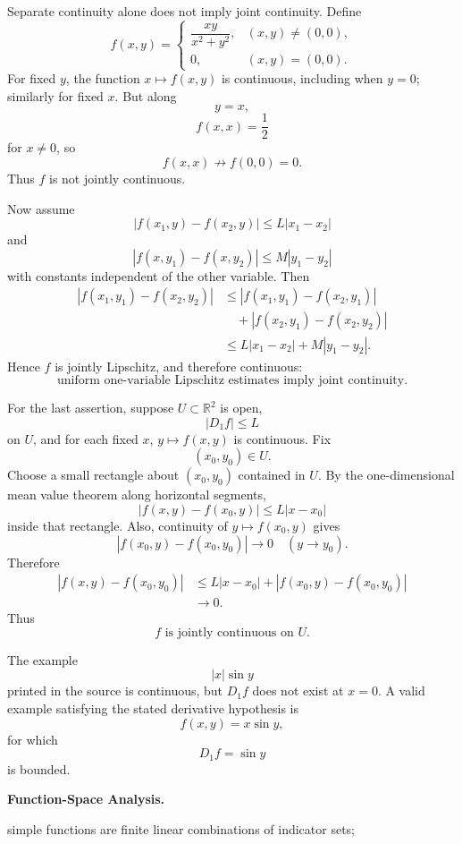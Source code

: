 \begin{solution}
Separate continuity alone does not imply joint continuity. Define
\[
f(x,y)
=
\begin{cases}
\dfrac{xy}{x^2+y^2},
&(x,y)\neq(0,0),\\[2mm]
0,&(x,y)=(0,0).
\end{cases}
\]
For fixed \(y\), the function \(x\mapsto f(x,y)\) is continuous, including when \(y=0\);
similarly for fixed \(x\). But along
\[
y=x,
\]
\[
f(x,x)=\frac12
\]
for \(x\neq0\), so
\[
f(x,x)\not\to f(0,0)=0.
\]
Thus \(f\) is not jointly continuous.

Now assume
\[
|f(x_1,y)-f(x_2,y)|
\le
L|x_1-x_2|
\]
and
\[
|f(x,y_1)-f(x,y_2)|
\le
M|y_1-y_2|
\]
with constants independent of the other variable. Then
\[
\begin{aligned}
|f(x_1,y_1)-f(x_2,y_2)|
&\le
|f(x_1,y_1)-f(x_2,y_1)|\\
&\quad+
|f(x_2,y_1)-f(x_2,y_2)|\\
&\le
L|x_1-x_2|+M|y_1-y_2|.
\end{aligned}
\]
Hence \(f\) is jointly Lipschitz, and therefore continuous:
\[
\boxed{
\text{uniform one-variable Lipschitz estimates imply joint continuity}.
}
\]

For the last assertion, suppose \(U\subset\mathbb R^2\) is open,
\[
|D_1f|\le L
\]
on \(U\), and for each fixed \(x\), \(y\mapsto f(x,y)\) is continuous. Fix
\[
(x_0,y_0)\in U.
\]
Choose a small rectangle about \((x_0,y_0)\) contained in \(U\). By the one-dimensional
mean value theorem along horizontal segments,
\[
|f(x,y)-f(x_0,y)|
\le
L|x-x_0|
\]
inside that rectangle. Also, continuity of \(y\mapsto f(x_0,y)\) gives
\[
|f(x_0,y)-f(x_0,y_0)|\to0
\quad(y\to y_0).
\]
Therefore
\[
\begin{aligned}
|f(x,y)-f(x_0,y_0)|
&\le
L|x-x_0|
+
|f(x_0,y)-f(x_0,y_0)|\\
&\to0.
\end{aligned}
\]
Thus
\[
\boxed{f\text{ is jointly continuous on }U.}
\]

The example
\[
|x|\sin y
\]
printed in the source is continuous, but \(D_1f\) does not exist at \(x=0\). A valid example
satisfying the stated derivative hypothesis is
\[
f(x,y)=x\sin y,
\]
for which
\[
D_1f=\sin y
\]
is bounded.
\end{solution}


\begin{problem}[CP-II-0472]
\label{prob:cp-ii-0472}
\textbf{Function-Space Analysis.}

\hspace*{1.5em}simple functions are finite linear combinations of indicator sets;
\end{problem}

